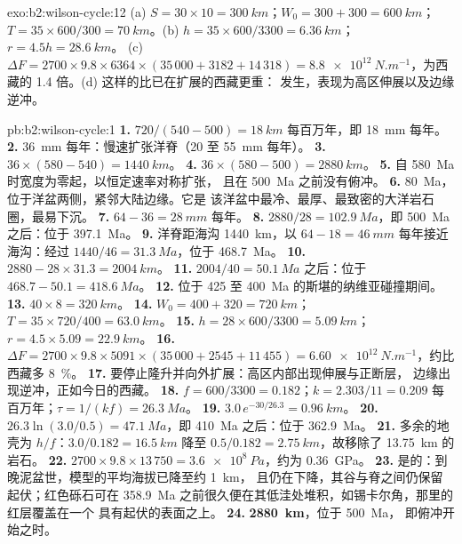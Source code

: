 \begin{solution}{exo:b2:wilson-cycle:12}
(a) $S = 30\times10 = \qty{300}{km}$；$W_0 = 300 + 300 = \qty{600}{km}$；$T = 35\times600/300 =
\qty{70}{km}$。(b) $h = 35\times600/3300 = \qty{6.36}{km}$；$r = 4.5h = \qty{28.6}{km}$。
(c) $\Delta F = 2700\times9.8\times6364\times(35\,000 + 3182 + 14\,318) =
\qty{8.8e12}{N.m^{-1}}$，为西藏的 1.4 倍。(d) 这样的比已在扩展的西藏更重：
发生，表现为高区伸展以及边缘逆冲。
\end{solution}

\begin{solution}{pb:b2:wilson-cycle:1}
\textbf{1.} $720/(540 - 500) = \qty{18}{km}$ 每百万年，即 \qty{18}{mm} 每年。
\textbf{2.} \qty{36}{mm} 每年：慢速扩张洋脊（20 至 \qty{55}{mm} 每年）。
\textbf{3.} $36\times(580 - 540) = \qty{1440}{km}$。
\textbf{4.} $36\times(580 - 500) = \qty{2880}{km}$。
\textbf{5.} 自 \qty{580}{Ma} 时宽度为零起，以恒定速率对称扩张，
且在 \qty{500}{Ma} 之前没有俯冲。
\textbf{6.} \qty{80}{Ma}，位于洋盆两侧，紧邻大陆边缘。它是
该洋盆中最冷、最厚、最致密的大洋岩石圈，最易下沉。
\textbf{7.} $64 - 36 = \qty{28}{mm}$ 每年。
\textbf{8.} $2880/28 = \qty{102.9}{Ma}$，即 \qty{500}{Ma} 之后：位于 \qty{397.1}{Ma}。
\textbf{9.} 洋脊距海沟 \qty{1440}{km}，以 $64 - 18 =
\qty{46}{mm}$ 每年接近海沟：经过 $1440/46 = \qty{31.3}{Ma}$，位于 \qty{468.7}{Ma}。
\textbf{10.} $2880 - 28\times31.3 = \qty{2004}{km}$。
\textbf{11.} $2004/40 = \qty{50.1}{Ma}$ 之后：位于 $468.7 - 50.1 = \qty{418.6}{Ma}$。
\textbf{12.} 位于 425 至 \qty{400}{Ma} 的斯堪的纳维亚碰撞期间。
\textbf{13.} $40\times8 = \qty{320}{km}$。
\textbf{14.} $W_0 = 400 + 320 = \qty{720}{km}$；$T = 35\times720/400 = \qty{63.0}{km}$。
\textbf{15.} $h = 28\times600/3300 = \qty{5.09}{km}$；$r = 4.5\times5.09 = \qty{22.9}{km}$。
\textbf{16.} $\Delta F = 2700\times9.8\times5091\times(35\,000 + 2545 + 11\,455) =
\qty{6.60e12}{N.m^{-1}}$，约比西藏多 \qty{8}{\percent}。
\textbf{17.} 要停止隆升并向外扩展：高区内部出现伸展与正断层，
边缘出现逆冲，正如今日的西藏。
\textbf{18.} $f = 600/3300 = 0.182$；$k = 2.303/11 = 0.209$ 每百万年；$\tau = 1/(kf)
= \qty{26.3}{Ma}$。
\textbf{19.} $3.0\,e^{-30/26.3} = \qty{0.96}{km}$。
\textbf{20.} $26.3\ln(3.0/0.5) = \qty{47.1}{Ma}$，即 \qty{410}{Ma} 之后：位于 \qty{362.9}{Ma}。
\textbf{21.} 多余的地壳为 $h/f$：$3.0/0.182 = \qty{16.5}{km}$ 降至 $0.5/0.182 =
\qty{2.75}{km}$，故移除了 \qty{13.75}{km} 的岩石。
\textbf{22.} $2700\times9.8\times13\,750 = \qty{3.6e8}{Pa}$，约为 \qty{0.36}{GPa}。
\textbf{23.} 是的：到晚泥盆世，模型的平均海拔已降至约 \qty{1}{km}，
且仍在下降，其谷与脊之间仍保留起伏；红色砾石可在
\qty{358.9}{Ma} 之前很久便在其低洼处堆积，如锡卡尔角，那里的红层覆盖在一个
具有起伏的表面之上。
\textbf{24.} \textbf{\qty[text-series-to-math=true]{2880}{km}}，位于 \qty{500}{Ma}，
即俯冲开始之时。
\end{solution}
